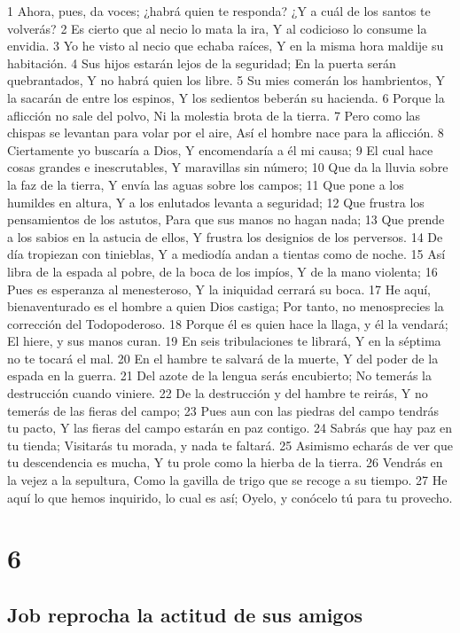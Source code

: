 1 Ahora, pues, da voces; ¿habrá quien te responda?
¿Y a cuál de los santos te volverás?
2 Es cierto que al necio lo mata la ira,
Y al codicioso lo consume la envidia.
3 Yo he visto al necio que echaba raíces,
Y en la misma hora maldije su habitación.
4 Sus hijos estarán lejos de la seguridad;
En la puerta serán quebrantados,
Y no habrá quien los libre.
5 Su mies comerán los hambrientos,
Y la sacarán de entre los espinos,
Y los sedientos beberán su hacienda.
6 Porque la aflicción no sale del polvo,
Ni la molestia brota de la tierra.
7 Pero como las chispas se levantan para volar por el aire,
Así el hombre nace para la aflicción.
8 Ciertamente yo buscaría a Dios,
Y encomendaría a él mi causa;
9 El cual hace cosas grandes e inescrutables,
Y maravillas sin número;
10 Que da la lluvia sobre la faz de la tierra,
Y envía las aguas sobre los campos;
11 Que pone a los humildes en altura,
Y a los enlutados levanta a seguridad;
12 Que frustra los pensamientos de los astutos,
Para que sus manos no hagan nada;
13 Que prende a los sabios en la astucia de ellos, 
Y frustra los designios de los perversos.
14 De día tropiezan con tinieblas,
Y a mediodía andan a tientas como de noche.
15 Así libra de la espada al pobre, de la boca de los impíos,
Y de la mano violenta;
16 Pues es esperanza al menesteroso,
Y la iniquidad cerrará su boca.
17 He aquí, bienaventurado es el hombre a quien Dios castiga;
Por tanto, no menosprecies la corrección del Todopoderoso. 
18 Porque él es quien hace la llaga, y él la vendará;
El hiere, y sus manos curan.
19 En seis tribulaciones te librará,
Y en la séptima no te tocará el mal.
20 En el hambre te salvará de la muerte,
Y del poder de la espada en la guerra.
21 Del azote de la lengua serás encubierto;
No temerás la destrucción cuando viniere.
22 De la destrucción y del hambre te reirás,
Y no temerás de las fieras del campo;
23 Pues aun con las piedras del campo tendrás tu pacto,
Y las fieras del campo estarán en paz contigo.
24 Sabrás que hay paz en tu tienda;
Visitarás tu morada, y nada te faltará.
25 Asimismo echarás de ver que tu descendencia es mucha,
Y tu prole como la hierba de la tierra.
26 Vendrás en la vejez a la sepultura,
Como la gavilla de trigo que se recoge a su tiempo.
27 He aquí lo que hemos inquirido, lo cual es así;
Oyelo, y conócelo tú para tu provecho.

\chapter{6}

\section*{Job reprocha la actitud de sus amigos}

